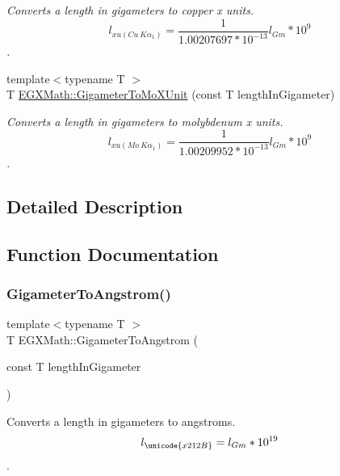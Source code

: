 \begin{DoxyCompactItemize}
\begin{DoxyCompactList}\small\item\em Converts a length in gigameters to copper x units. \[ l_{xu(Cu\ K\alpha_1)}= \frac{1}{1.00207697*10^{-13}} l_{Gm} * 10^{9}\]. \end{DoxyCompactList}\item 
{\footnotesize template$<$typename T $>$ }\\T \mbox{\hyperlink{group___e_g_x_math-_conversions-_length_conversions-_s_i-_gigameter-_non-_s_i_gac30ae06633de77b05d859ffb3cd2a577}{E\+G\+X\+Math\+::\+Gigameter\+To\+Mo\+X\+Unit}} (const T length\+In\+Gigameter)
\begin{DoxyCompactList}\small\item\em Converts a length in gigameters to molybdenum x units. \[ l_{xu(Mo\ K\alpha_1)}=\frac{1}{1.00209952*10^{-13}} l_{Gm} * 10^{9}\]. \end{DoxyCompactList}\end{DoxyCompactItemize}


\subsection{Detailed Description}


\subsection{Function Documentation}
\mbox{\label{group___e_g_x_math-_conversions-_length_conversions-_s_i-_gigameter-_non-_s_i_ga622e85e3f663039f3802b29d25655989}} 
\subsubsection{\texorpdfstring{Gigameter\+To\+Angstrom()}{GigameterToAngstrom()}}
{\footnotesize\ttfamily template$<$typename T $>$ \\
T E\+G\+X\+Math\+::\+Gigameter\+To\+Angstrom (\begin{DoxyParamCaption}\item[{const T}]{length\+In\+Gigameter }\end{DoxyParamCaption})}



Converts a length in gigameters to angstroms. \[ l_{\unicode{x212B}}=l_{Gm} * 10^{19} \]. 

